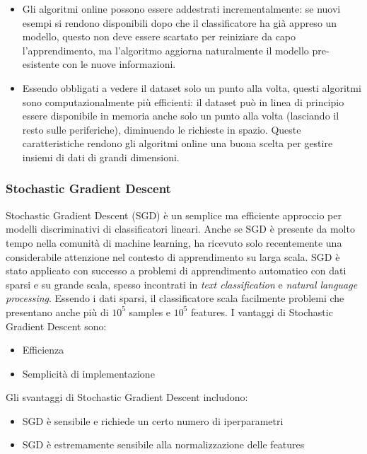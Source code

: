 \begin{itemize}
	\item Gli algoritmi online possono essere addestrati incrementalmente: se nuovi esempi
si rendono disponibili dopo che il classificatore ha già appreso un modello, questo non deve essere scartato per reiniziare da capo l'apprendimento, ma l'algoritmo aggiorna naturalmente il modello pre-esistente con le nuove informazioni.
	\item Essendo obbligati a vedere il dataset solo un punto alla volta, questi algoritmi sono computazionalmente più efficienti: il dataset può in linea di principio essere disponibile in memoria anche solo un punto alla volta (lasciando il resto sulle periferiche), diminuendo le richieste in spazio.
Queste caratteristiche rendono gli algoritmi online una buona scelta per gestire insiemi di dati di grandi dimensioni.
\end{itemize}


\subsubsection{Stochastic Gradient Descent}
Stochastic Gradient Descent\cite{gardner1984learning} (SGD) è un semplice ma efficiente approccio per modelli discriminativi di classificatori lineari. Anche se SGD è presente da molto tempo nella comunità di machine learning, ha ricevuto solo recentemente una considerabile attenzione nel contesto di apprendimento su larga scala\cite{zhang2004solving}. SGD è stato applicato con successo a problemi di apprendimento automatico con dati sparsi e su grande scala, spesso incontrati in \textit{text classification} e \textit{natural language processing}. Essendo i dati sparsi, il classificatore scala facilmente problemi che presentano anche più di $10^5$ samples e $10^5$ features.\newline
I vantaggi di Stochastic Gradient Descent sono:
\begin{itemize}
	\item Efficienza
	\item Semplicità di implementazione
\end{itemize}
Gli svantaggi di Stochastic Gradient Descent includono:
\begin{itemize}
	\item SGD è sensibile e richiede un certo numero di iperparametri
	\item SGD è estremamente sensibile alla normalizzazione delle features
\end{itemize}


